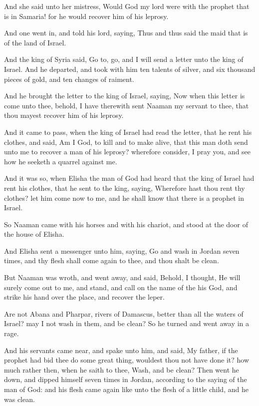 \Verse And she said unto her mistress, Would God my lord were with the prophet that is in Samaria! for he would recover him of his leprosy.

\Verse And one went in, and told his lord, saying, Thus and thus said the maid that is of the land of Israel.

\Verse And the king of Syria said, Go to, go, and I will send a letter unto the king of Israel. And he departed, and took with him ten talents of silver, and six thousand pieces of gold, and ten changes of raiment.

\Verse And he brought the letter to the king of Israel, saying, Now when this letter is come unto thee, behold, I have therewith sent Naaman my servant to thee, that thou mayest recover him of his leprosy.

\Verse And it came to pass, when the king of Israel had read the letter, that he rent his clothes, and said, Am I God, to kill and to make alive, that this man doth send unto me to recover a man of his leprosy? wherefore consider, I pray you, and see how he seeketh a quarrel against me.

\Verse And it was so, when Elisha the man of God had heard that the king of Israel had rent his clothes, that he sent to the king, saying, Wherefore hast thou rent thy clothes? let him come now to me, and he shall know that there is a prophet in Israel.

\Verse So Naaman came with his horses and with his chariot, and stood at the door of the house of Elisha.

\Verse And Elisha sent a messenger unto him, saying, Go and wash in Jordan seven times, and thy flesh shall come again to thee, and thou shalt be clean.

\Verse But Naaman was wroth, and went away, and said, Behold, I thought, He will surely come out to me, and stand, and call on the name of the \LORD his God, and strike his hand over the place, and recover the leper.

\Verse Are not Abana and Pharpar, rivers of Damascus, better than all the waters of Israel? may I not wash in them, and be clean? So he turned and went away in a rage.

\Verse And his servants came near, and spake unto him, and said, My father, if the prophet had bid thee do some great thing, wouldest thou not have done it? how much rather then, when he saith to thee, Wash, and be clean?  \Verse Then went he down, and dipped himself seven times in Jordan, according to the saying of the man of God: and his flesh came again like unto the flesh of a little child, and he was clean.


